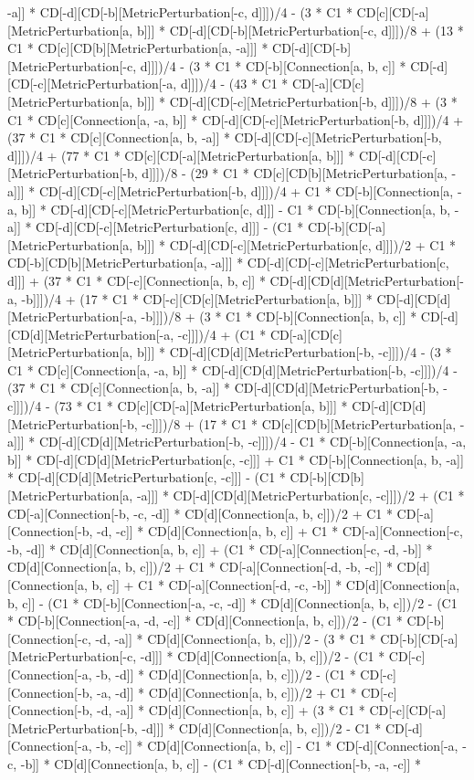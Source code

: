-a]] * CD[-d][CD[-b][MetricPerturbation[-c, d]]])/4 - (3 * C1 * CD[c][CD[-a][MetricPerturbation[a, b]]] * CD[-d][CD[-b][MetricPerturbation[-c, d]]])/8 + (13 * C1 * CD[c][CD[b][MetricPerturbation[a, -a]]] * CD[-d][CD[-b][MetricPerturbation[-c, d]]])/4 - (3 * C1 * CD[-b][Connection[a, b, c]] * CD[-d][CD[-c][MetricPerturbation[-a, d]]])/4 - (43 * C1 * CD[-a][CD[c][MetricPerturbation[a, b]]] * CD[-d][CD[-c][MetricPerturbation[-b, d]]])/8 + (3 * C1 * CD[c][Connection[a, -a, b]] * CD[-d][CD[-c][MetricPerturbation[-b, d]]])/4 + (37 * C1 * CD[c][Connection[a, b, -a]] * CD[-d][CD[-c][MetricPerturbation[-b, d]]])/4 + (77 * C1 * CD[c][CD[-a][MetricPerturbation[a, b]]] * CD[-d][CD[-c][MetricPerturbation[-b, d]]])/8 - (29 * C1 * CD[c][CD[b][MetricPerturbation[a, -a]]] * CD[-d][CD[-c][MetricPerturbation[-b, d]]])/4 + C1 * CD[-b][Connection[a, -a, b]] * CD[-d][CD[-c][MetricPerturbation[c, d]]] - C1 * CD[-b][Connection[a, b, -a]] * CD[-d][CD[-c][MetricPerturbation[c, d]]] - (C1 * CD[-b][CD[-a][MetricPerturbation[a, b]]] * CD[-d][CD[-c][MetricPerturbation[c, d]]])/2 + C1 * CD[-b][CD[b][MetricPerturbation[a, -a]]] * CD[-d][CD[-c][MetricPerturbation[c, d]]] + (37 * C1 * CD[-c][Connection[a, b, c]] * CD[-d][CD[d][MetricPerturbation[-a, -b]]])/4 + (17 * C1 * CD[-c][CD[c][MetricPerturbation[a, b]]] * CD[-d][CD[d][MetricPerturbation[-a, -b]]])/8 + (3 * C1 * CD[-b][Connection[a, b, c]] * CD[-d][CD[d][MetricPerturbation[-a, -c]]])/4 + (C1 * CD[-a][CD[c][MetricPerturbation[a, b]]] * CD[-d][CD[d][MetricPerturbation[-b, -c]]])/4 - (3 * C1 * CD[c][Connection[a, -a, b]] * CD[-d][CD[d][MetricPerturbation[-b, -c]]])/4 - (37 * C1 * CD[c][Connection[a, b, -a]] * CD[-d][CD[d][MetricPerturbation[-b, -c]]])/4 - (73 * C1 * CD[c][CD[-a][MetricPerturbation[a, b]]] * CD[-d][CD[d][MetricPerturbation[-b, -c]]])/8 + (17 * C1 * CD[c][CD[b][MetricPerturbation[a, -a]]] * CD[-d][CD[d][MetricPerturbation[-b, -c]]])/4 - C1 * CD[-b][Connection[a, -a, b]] * CD[-d][CD[d][MetricPerturbation[c, -c]]] + C1 * CD[-b][Connection[a, b, -a]] * CD[-d][CD[d][MetricPerturbation[c, -c]]] - (C1 * CD[-b][CD[b][MetricPerturbation[a, -a]]] * CD[-d][CD[d][MetricPerturbation[c, -c]]])/2 + (C1 * CD[-a][Connection[-b, -c, -d]] * CD[d][Connection[a, b, c]])/2 + C1 * CD[-a][Connection[-b, -d, -c]] * CD[d][Connection[a, b, c]] + C1 * CD[-a][Connection[-c, -b, -d]] * CD[d][Connection[a, b, c]] + (C1 * CD[-a][Connection[-c, -d, -b]] * CD[d][Connection[a, b, c]])/2 + C1 * CD[-a][Connection[-d, -b, -c]] * CD[d][Connection[a, b, c]] + C1 * CD[-a][Connection[-d, -c, -b]] * CD[d][Connection[a, b, c]] - (C1 * CD[-b][Connection[-a, -c, -d]] * CD[d][Connection[a, b, c]])/2 - (C1 * CD[-b][Connection[-a, -d, -c]] * CD[d][Connection[a, b, c]])/2 - (C1 * CD[-b][Connection[-c, -d, -a]] * CD[d][Connection[a, b, c]])/2 - (3 * C1 * CD[-b][CD[-a][MetricPerturbation[-c, -d]]] * CD[d][Connection[a, b, c]])/2 - (C1 * CD[-c][Connection[-a, -b, -d]] * CD[d][Connection[a, b, c]])/2 - (C1 * CD[-c][Connection[-b, -a, -d]] * CD[d][Connection[a, b, c]])/2 + C1 * CD[-c][Connection[-b, -d, -a]] * CD[d][Connection[a, b, c]] + (3 * C1 * CD[-c][CD[-a][MetricPerturbation[-b, -d]]] * CD[d][Connection[a, b, c]])/2 - C1 * CD[-d][Connection[-a, -b, -c]] * CD[d][Connection[a, b, c]] - C1 * CD[-d][Connection[-a, -c, -b]] * CD[d][Connection[a, b, c]] - (C1 * CD[-d][Connection[-b, -a, -c]] * 